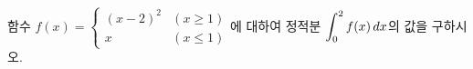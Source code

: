 함수 $f(x)=\begin{cases} (x-2)^2 & (x\ge 1) \\ x & (x\le 1) \end{cases}$에 대하여 정적분 $\displaystyle\int_{0}^{2}f(x)\mkern3mu dx$의 값을 구하시오.
